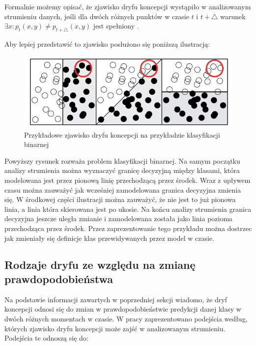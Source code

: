 Formalnie możemy opisać, że zjawisko dryfu koncepcji wystąpiło w analizowanym strumieniu danych, jeśli dla dwóch różnych punktów w czasie $t$ i $t + \triangle$ warunek $\exists x : p_t(x, y) \ne p_{t + \triangle}(x, y)$ jest spełniony \cite{Article:DriftGama}\cite{Article:DriftGama2}.

Aby lepiej przedstawić to zjawisko posłużono się poniższą ilustracją:

\begin{figure}[h] 
    \centering\includegraphics[width=14cm]{figures/concept_drift_example.JPG}
    \caption{Przykładowe zjawisko dryfu koncepcji na przykładzie klasyfikacji binarnej \cite{DBrzezinski:Prezentacja}}
\end{figure}

\noindent Powyższy rysunek rozważa problem klasyfikacji binarnej. Na samym początku analizy strumienia można wyznaczyć granicę decyzyjną między klasami, która modelowana jest przez pionową linię przechodzącą przez środek. Wraz z upływem czasu można zauważyć jak wcześniej zamodelowana granica decyzyjna zmienia się. W środkowej części ilustracji można zauważyć, że nie jest to już pionowa linia, a linia która skierowana jest po ukosie. Na końcu analizy strumienia granica decyzyjna jeszcze uległa zmianie i zamodelowana została jako linia pozioma przechodząca przez środek. Przez zaprezentowanie tego przykładu można dostrzec jak zmieniały się definicje klas przewidywanych przez model w czasie.

\subsection{Rodzaje dryfu ze względu na zmianę prawdopodobieństwa}

\noindent Na podstawie informacji zawartych w poprzedniej sekcji wiadomo, że dryf koncepcji odnosi się do zmian w prawdopodobieństwie predykcji danej klasy w dwóch różnych momentach w czasie. W pracy \cite{Article:Kelly} zaprezentowano podejścia według, których zjawisko dryfu koncepcji może zajść w analizowanym strumieniu. Podejścia te odnoszą się do:

